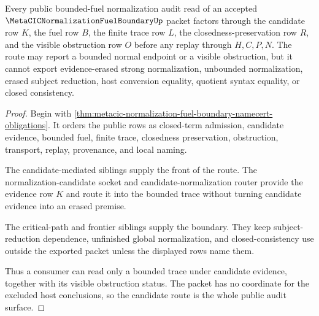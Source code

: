 \begin{theorem}
\label{thm:metacic-normalization-fuel-boundary-candidate-route}
Every public bounded-fuel normalization audit read of an accepted $\MetaCICNormalizationFuelBoundaryUp$ packet factors through the candidate row $K$, the fuel row $B$, the finite trace row $L$, the closedness-preservation row $R$, and the visible obstruction row $O$ before any replay through $H,C,P,N$. The route may report a bounded normal endpoint or a visible obstruction, but it cannot export evidence-erased strong normalization, unbounded normalization, erased subject reduction, host conversion equality, quotient syntax equality, or closed consistency.
\end{theorem}
\begin{proof}
Begin with \autoref{thm:metacic-normalization-fuel-boundary-namecert-obligations}. It orders the public rows as closed-term admission, candidate evidence, bounded fuel, finite trace, closedness preservation, obstruction, transport, replay, provenance, and local naming.

The candidate-mediated siblings supply the front of the route. The normalization-candidate socket and candidate-normalization router provide the evidence row $K$ and route it into the bounded trace without turning candidate evidence into an erased premise.

The critical-path and frontier siblings supply the boundary. They keep subject-reduction dependence, unfinished global normalization, and closed-consistency use outside the exported packet unless the displayed rows name them.

Thus a consumer can read only a bounded trace under candidate evidence, together with its visible obstruction status. The packet has no coordinate for the excluded host conclusions, so the candidate route is the whole public audit surface.
\end{proof}



